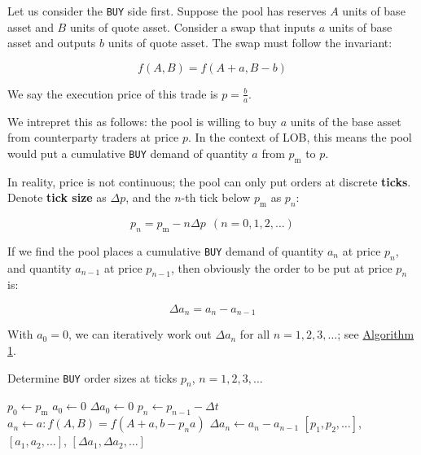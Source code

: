 \documentclass{article}
\begin{document}
Let us consider the \texttt{BUY} side first. Suppose the pool has reserves $A$ units of base asset and $B$ units of quote asset. Consider a swap that inputs $a$ units of base asset and outputs $b$ units of quote asset. The swap must follow the invariant:

\begin{equation}
  f(A, B) = f(A + a, B - b)
\end{equation}

We say the execution price of this trade is $p = \frac{b}{a}$.

We intrepret this as follows: the pool is willing to buy $a$ units of the base asset from counterparty traders at price $p$. In the context of LOB, this means the pool would put a cumulative \texttt{BUY} demand of quantity $a$ from $p_{\mathrm{m}}$ to $p$.

In reality, price is not continuous; the pool can only put orders at discrete \textbf{ticks}. Denote \textbf{tick size} as $\Delta p$, and the $n$-th tick below $p_{\mathrm{m}}$ as $p_n$:

\begin{equation}
  p_n = p_{\mathrm{m}} - n \Delta p \ \ (n = 0, 1, 2, \dots)
\end{equation}

If we find the pool places a cumulative \texttt{BUY} demand of quantity $a_n$ at price $p_n$, and quantity $a_{n-1}$ at price $p_{n-1}$, then obviously the order to be put at price $p_n$ is:

\begin{equation}
  \Delta a_n = a_n - a_{n-1}
\end{equation}

With $a_0 = 0$, we can iteratively work out $\Delta a_n$ for all $n = 1, 2, 3, \dots$; see \hyperref[alg:1]{Algorithm 1}.

\begin{algorithm}
  \caption{Determine \texttt{BUY} order sizes at ticks $p_n$, $n = 1, 2, 3, \dots$}
  \label{alg:1}
  \begin{algorithmic}
    \State $p_0 \gets p_{\mathrm{m}}$
    \State $a_0 \gets 0$
    \State $\Delta a_0 \gets 0$
    \State $p_n \gets p_{n-1} - \Delta t$
    \State $a_n \gets a: f(A, B) = f(A + a, b - p_n a)$ 
    \State $\Delta a_n \gets a_n - a_{n-1}$
    \EndFor
    \State \Return $[p_1, p_2, \dots]$, $[a_1, a_2, \dots]$, $[\Delta a_1, \Delta a_2, \dots]$
  \end{algorithmic}
\end{algorithm}
\end{document}
